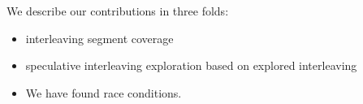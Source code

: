 We describe our contributions in three folds:

\begin{itemize}
\item interleaving segment coverage
\item speculative interleaving exploration based on explored interleaving
\item We have found \totalbugs race conditions.
\end{itemize}

